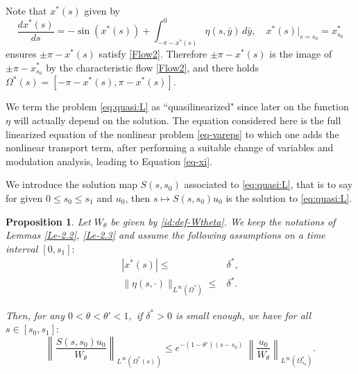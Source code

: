 \documentclass[12pt]{amsart}
\numberwithin{equation}{section}
\numberwithin{equation}{section}
\newtheorem{prop}[thm]{Proposition}
\newcommand{\cp}[1]{{\color{darkblue}{#1}}}
\newcommand{\cpcomment}[1]{\ \newline\textcolor{darkblue}{+++++++++++++++++++++}\newline
\textcolor{darkblue}{#1}\newline\textcolor{darkblue}{+++++++++++++++++++++}\newline
}
\begin{document}
  Note that   $x^*(s)$ given by
\begin{equation}\label{def-x*-Q-S3}
\frac{d x^*(s)}{ds}=-\sin(x^*(s))  + \int_{-\pi-x^*(s)}^0\eta(s, \bar y)\, d\bar y,  \quad x^*(s)|_{s=s_0}=x^*_{s_0}
  \end{equation}
  ensures  $\pm\pi-x^*(s)$   satisfy \eqref{Flow2}.    Therefore $\pm\pi-x^*(s)$ is the image of $\pm\pi-x^*_{s_0}$ by the characteristic flow \eqref{Flow2},  and there holds $\Omega^*(s)=[-\pi-x^*(s),  \pi-x^*(s)]$.

We term the problem \eqref{eq:quasi:L} as ``quasilinearized" since later on the function $\eta$ will actually depend on the solution. The equation  considered here is the full linearized equation of  the nonlinear problem \eqref{eq-vareps} to which one adds the nonlinear transport term,  after performing a suitable change of variables and modulation analysis, leading to Equation \eqref{eq-xi}.


    We introduce the solution map $S(s,s_0)$ associated to  \eqref{eq:quasi:L},
that is to say  for given $0\leq s_0 \leq s_1$ and $u_0$,  then $s\mapsto S(s,s_0)u_0$ is the solution to \eqref{eq:quasi:L}.
 
 
 
\begin{prop}\label{Prop-quasi}
Let $W_\theta$ be given by \eqref{id:def-Wtheta}. We keep the notations of Lemmas   \ref{Le-2.2},  \ref{Le-2.3} and assume the following assumptions  on a time interval $[0, s_1]:$
 \begin{align}
|x^*(s)|\leq& \delta^*, \label{bd:Leq2}\\
  \|\eta(s, \cdot)\|_{L^{\infty}(\Omega^*)}\leq& \delta^*.\label{bd:Leq3}
 \end{align} 

 Then, for any $0<\theta<\theta'<1,$ if $\delta^*>0$ is small enough, we have for all $s\in [s_0,s_1]:$
\begin{equation}\label{eq-Prop3.4}
\left\|\frac{S(s,s_0)u_0}{W_\theta}\right\|_{L^\infty{(\Omega^*(s))}}\leq  e^{-(1-\theta')(s-s_0)}~
 \left\|\frac{u_0}{W_\theta}\right\|_{L^\infty{(\Omega^*_{s_0})}}.
\end{equation}

\end{prop}
   
\end{document}
